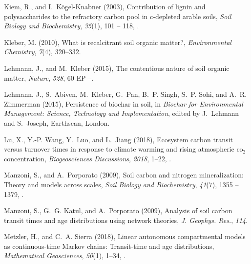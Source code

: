 \documentclass[draft,linenumbers]{agujournal}
\begin{document}
\begin{thebibliography}{41}
Kiem, R., and I.~K{\"o}gel-Knabner (2003), Contribution of lignin and
  polysaccharides to the refractory carbon pool in c-depleted arable soils,
  \textit{Soil Biology and Biochemistry}, \textit{35}(1), 101 -- 118,
  .

Kleber, M. (2010), What is recalcitrant soil organic matter?,
  \textit{Environmental Chemistry}, \textit{7}(4), 320--332.

Lehmann, J., and M.~Kleber (2015), The contentious nature of soil organic
  matter, \textit{Nature}, \textit{528}, 60 EP --.

Lehmann, J., S.~Abiven, M.~Kleber, G.~Pan, B.~P. Singh, S.~P. Sohi, and A.~R.
  Zimmerman (2015), Persistence of biochar in soil, in \textit{Biochar for
  Environmental Management: Science, Technology and Implementation}, edited by
  J.~Lehmann and S.~Joseph, Earthscan, London.

Lu, X., Y.-P. Wang, Y.~Luo, and L.~Jiang (2018), Ecosystem carbon transit
  versus turnover times in response to climate warming and rising atmospheric
  co$_2$ concentration, \textit{Biogeosciences Discussions}, \textit{2018},
  1--22, .

Manzoni, S., and A.~Porporato (2009), Soil carbon and nitrogen mineralization:
  Theory and models across scales, \textit{Soil Biology and Biochemistry},
  \textit{41}(7), 1355 -- 1379,
  .

Manzoni, S., G.~G. Katul, and A.~Porporato (2009), Analysis of soil carbon
  transit times and age distributions using network theories, \textit{J.
  Geophys. Res.}, \textit{114}.

Metzler, H., and C.~A. Sierra (2018), Linear autonomous compartmental models as
  continuous-time {Markov} chains: Transit-time and age distributions,
  \textit{Mathematical Geosciences}, \textit{50}(1), 1--34,
  .


\end{thebibliography}
\end{document}
